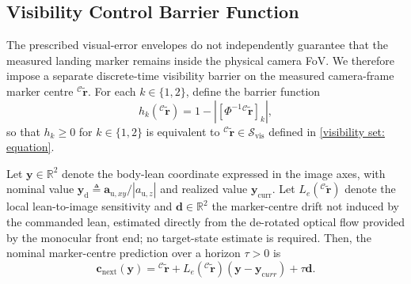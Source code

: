 \documentclass[10pt,conference]{IEEEtran}
\begin{document}

\subsection{Visibility Control Barrier Function}
\label{subsec:visibility}
The prescribed visual-error envelopes do not independently guarantee that the measured landing marker remains inside the physical camera FoV. We therefore impose a separate discrete-time visibility barrier on the measured camera-frame marker centre ${}^{\mathcal C}\tilde{\boldsymbol r}$.
For each $k\in\{1,2\}$, define the barrier function
\begin{equation}
    h_k({}^{\mathcal C}\tilde{\boldsymbol r}) = 1 - \left| \left[ \Phi^{-1} {}^{\mathcal C}\tilde{\boldsymbol r} \right]_k \right|,
    \label{cbf barrier: equation}
\end{equation}
so that $h_k\ge0$ for $k\in\{1,2\}$ is equivalent to ${}^{\mathcal C}\tilde{\boldsymbol r}\in\mathcal S_{\mathrm{vis}}$ defined in \eqref{visibility set: equation}.

Let $\boldsymbol y\in\mathbb R^2$ denote the body-lean coordinate expressed in the image axes, with nominal value $\boldsymbol y_{\mathrm d}\triangleq \boldsymbol a_{\mathrm u,xy}/|a_{\mathrm u,z}|$ and realized value $\boldsymbol y_{\mathrm{curr}}$.
Let $L_e({}^{\mathcal C}\tilde{\boldsymbol r})$ denote the local lean-to-image sensitivity and $\boldsymbol d\in\mathbb R^2$ the marker-centre drift not induced by the commanded lean, estimated directly from the de-rotated optical flow provided by the monocular front end; no target-state estimate is required.
Then, the nominal marker-centre prediction over a horizon $\tau>0$ is
\begin{equation}
    \boldsymbol c_{\mathrm{next}}(\boldsymbol y) = {}^{\mathcal C}\tilde{\boldsymbol r} + L_e({}^{\mathcal C}\tilde{\boldsymbol r}) \left(\boldsymbol y-\boldsymbol y_{\mathrm curr}\right) + \tau\boldsymbol d.
    \label{predicted marker centre: equation}
\end{equation}
\end{document}
